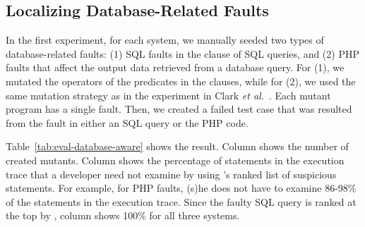 \subsection{Localizing Database-Related Faults}



In the first experiment, for each system, we manually 
seeded two types of database-related faults: (1) SQL faults in the
 clause of SQL queries, and (2) PHP faults that affect
the output data
retrieved from a database query. For (1), we mutated the operators of
the predicates in the  clauses, while for (2), we used
the same mutation strategy as in the experiment in Clark {\em et
al.}~\cite{ga-ase11}. Each mutant program has a single fault. Then, we
created a failed test case that was resulted from the fault in either
an SQL query or the PHP code.

Table~\ref{tab:eval-database-aware} shows the result. Column
 shows the number of created mutants.  Column  shows the percentage of statements in the execution
trace that a developer need not examine by using \tool{}'s ranked list of
suspicious statements. For example, for PHP faults, (s)he does not
have to examine 86-98\% of the statements in the execution
trace. Since the faulty SQL query is ranked at the top by \tool{},
column  shows 100\% for all three systems.

